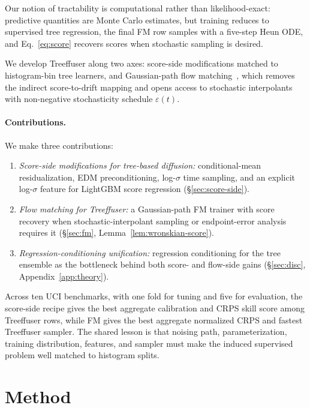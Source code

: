 \documentclass{tpm2026}
\begin{document}
Our notion of tractability is computational rather than likelihood-exact: predictive quantities are Monte Carlo estimates, but training reduces to supervised tree regression, the final FM row samples with a five-step Heun ODE, and Eq.~\eqref{eq:score} recovers scores when stochastic sampling is desired.

We develop Treeffuser along two axes: score-side modifications matched to histogram-bin tree learners, and Gaussian-path flow matching~\citep{lipman2023flow,liu2023rectified}, which removes the indirect score-to-drift mapping and opens access to stochastic interpolants~\citep{albergo2023stochastic} with non-negative stochasticity schedule $\varepsilon(t)$.

\paragraph{Contributions.} We make three contributions:
\begin{enumerate}
  \item \emph{Score-side modifications for tree-based diffusion:} conditional-mean residualization, EDM preconditioning, log-$\sigma$ time sampling, and an explicit log-$\sigma$ feature for LightGBM score regression (\S\ref{sec:score-side}).
  \item \emph{Flow matching for Treeffuser:} a Gaussian-path FM trainer with score recovery when stochastic-interpolant sampling or endpoint-error analysis requires it (\S\ref{sec:fm}, Lemma~\ref{lem:wronskian-score}).
  \item \emph{Regression-conditioning unification:} regression conditioning for the tree ensemble as the bottleneck behind both score- and flow-side gains (\S\ref{sec:disc}, Appendix~\ref{app:theory}).
\end{enumerate}

Across ten UCI benchmarks, with one fold for tuning and five for evaluation, the score-side recipe gives the best aggregate calibration and CRPS skill score among Treeffuser rows, while FM gives the best aggregate normalized CRPS and fastest Treeffuser sampler. The shared lesson is that noising path, parameterization, training distribution, features, and sampler must make the induced supervised problem well matched to histogram splits.

\section{Method}\label{sec:method}
\end{document}
